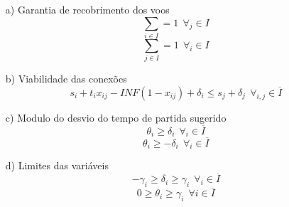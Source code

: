 \begin{enumerate}


\item[a)] Garantia de recobrimento dos voos \\
\begin{equation}
  \sum_{i \in I} = 1 \   \ \forall_{j} \in I 
\end{equation}
\begin{equation}
\sum_{j \in I} = 1 \   \ \forall_{i} \in I
\end{equation}

\item[b)] Viabilidade das conexões \\
\begin{equation}
s_{i} + t_{i}x_{ij} - INF(1 - x_{ij}) + \delta_{i} \leq s_{j} + \delta_{j} \   \ \forall_{i,j} \in \overline{I}
\end{equation}

\item[c)] Modulo do desvio do tempo de partida sugerido \\
\begin{equation}
\theta_{i} \geq \delta_{i} \   \ \forall_{i} \in \overline{I}
\end{equation}
\begin{equation}
\theta_{i} \geq -\delta_{i} \   \ \forall_{i} \in \overline{I}
\end{equation}

\item[d)] Limites das variáveis \\
\begin{equation}
-\gamma_{i} \geq \delta_{i} \geq \gamma_{i} \   \ \forall_{i} \in \overline{I}
\end{equation}
\begin{equation}
0 \geq \theta_{i} \geq \gamma_{i} \   \ \forall{i} \in \overline{I}
\end{equation}
\end{enumerate}


  	